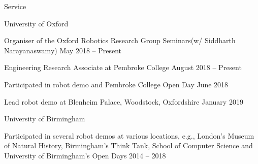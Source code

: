 
\begin{rSection}{Service}

\begin{rSubsection}{University of Oxford}{}{}{}
\item Organiser of the Oxford Robotics Research Group Seminars\newline (w/ Siddharth Narayanaswamy) \hfill May 2018 -- Present
\item Engineering Research Associate at Pembroke College \hfill August 2018 -- Present
\item Participated in robot demo and Pembroke College Open Day \hfill June 2018
\item Lead robot demo at Blenheim Palace, Woodstock, Oxfordshire \hfill January 2019
\end{rSubsection}

\pagebreak

\begin{rSubsection}{University of Birmingham}{}{}{}
\item Participated in several robot demos at various locations, e.g., London's  Museum of Natural History, Birmingham's Think Tank,  School of  Computer Science and University of Birmingham's Open Days \hfill 2014 -- 2018
\end{rSubsection}




\end{rSection}
